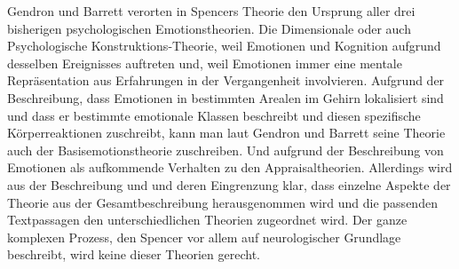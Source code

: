 Gendron und Barrett verorten in Spencers Theorie den Ursprung aller drei bisherigen psychologischen Emotionstheorien. Die Dimensionale oder auch Psychologische Konstruktions-Theorie, weil Emotionen und Kognition aufgrund desselben Ereignisses auftreten und, weil Emotionen immer eine mentale Repräsentation aus Erfahrungen in der Vergangenheit involvieren. Aufgrund der Beschreibung, dass Emotionen in bestimmten Arealen im Gehirn lokalisiert sind und dass er bestimmte emotionale Klassen beschreibt und diesen spezifische Körperreaktionen zuschreibt, kann man laut Gendron und Barrett seine Theorie auch der Basisemotionstheorie zuschreiben. Und aufgrund der Beschreibung von Emotionen als aufkommende Verhalten zu den  Appraisaltheorien. Allerdings wird aus der Beschreibung und und deren Eingrenzung klar, dass einzelne Aspekte der Theorie aus der Gesamtbeschreibung herausgenommen wird und die passenden Textpassagen den unterschiedlichen Theorien zugeordnet wird. Der ganze komplexen Prozess, den Spencer vor allem auf neurologischer Grundlage beschreibt, wird keine dieser Theorien gerecht.\\


